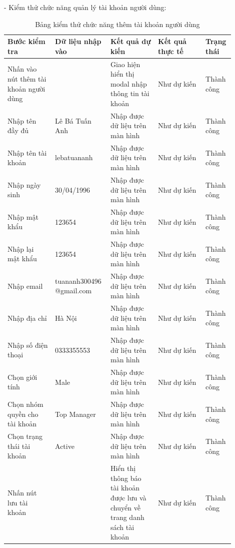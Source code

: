 - Kiểm thử chức năng quản lý tài khoản người dùng:
\begin{longtable}[htp]{ |m{0.2\linewidth}|m{0.2\linewidth}|m{0.2\linewidth}|m{0.2\linewidth}|m{0.1\linewidth}|}
 \caption{Bảng kiểm thử chức năng thêm tài khoản người dùng \label{updateProduct}}\\
 \hline
 Bước kiểm tra & Dữ liệu nhập vào & Kết quả dự kiến & Kết quả thực tế & Trạng thái \\
 \hline
  Nhấn vào nút thêm tài khoản người dùng & & Giao hiện hiển thị modal nhập thông tin tài khoản & Như dự kiến & Thành công\\
 \hline
   Nhập tên đầy đủ & Lê Bá Tuấn Anh & Nhập được dữ liệu trên màn hình & Như dự kiến & Thành công\\
 \hline
   Nhập tên tài khoản & lebatuananh & Nhập được dữ liệu trên màn hình & Như dự kiến & Thành công\\
 \hline
   Nhập ngày sinh & 30/04/1996 & Nhập được dữ liệu trên màn hình & Như dự kiến & Thành công\\
 \hline
   Nhập mật khẩu & 123654 & Nhập được dữ liệu trên màn hình & Như dự kiến & Thành công\\
 \hline
   Nhập lại mật khẩu & 123654 & Nhập được dữ liệu trên màn hình & Như dự kiến & Thành công\\
 \hline
   Nhập email & tuananh300496 @gmail.com & Nhập được dữ liệu trên màn hình & Như dự kiến & Thành công\\
 \hline
   Nhập địa chỉ & Hà Nội & Nhập được dữ liệu trên màn hình & Như dự kiến & Thành công\\
 \hline
   Nhập số điện thoại & 0333355553 & Nhập được dữ liệu trên màn hình & Như dự kiến & Thành công\\
 \hline
   Chọn giới tính & Male & Nhập được dữ liệu trên màn hình & Như dự kiến & Thành công\\
 \hline
   Chọn nhóm quyền cho tài khoản & Top Manager & Nhập được dữ liệu trên màn hình & Như dự kiến & Thành công\\
 \hline
    Chọn trạng thái tài khoản & Active & Nhập được dữ liệu trên màn hình & Như dự kiến & Thành công\\
 \hline
    Nhấn nút lưu tài khoản && Hiển thị thông báo tài khoản được lưu và chuyển về trang danh sách tài khoản  & Như dự kiến & Thành công\\
 \hline
\end{longtable}


